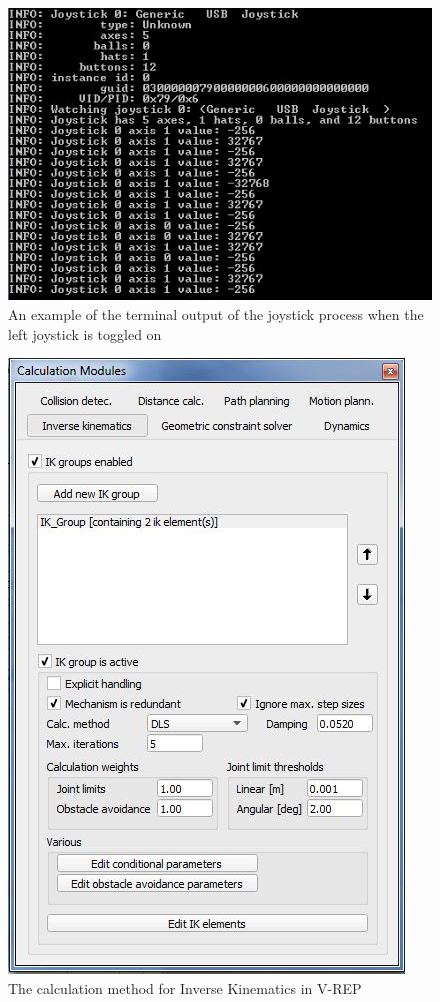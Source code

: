 \documentclass[12pt,openany,a4paper]{book}
\begin{document}
\begin{center}
\begin{figure}[htb]
  \includegraphics[width=0.9\linewidth]{joystick_cmdline.jpg}
\caption{An example of the terminal output of the joystick process when the left joystick is toggled on}
\end{figure}
\end{center}


\begin{center}
\begin{figure}[htb]
  \includegraphics[width=0.5\linewidth]{VREP_ik_dialog.jpg}
\caption{The calculation method for Inverse Kinematics in V-REP}
\end{figure}
\end{center}
\end{document}
